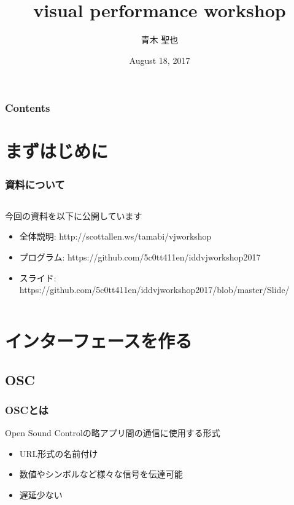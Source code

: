 \documentclass[10pt, dvipdfmx]{beamer}
\title{visual performance workshop}
\author{青木 聖也}
\institute[所属]{多摩美術大学情報デザイン研究室}
\date{August 18, 2017}
\begin{document}
    \begin{frame}[plain]
        \frametitle{}
	    \titlepage
    \end{frame}

    \begin{frame}
        \frametitle{Contents}
        \tableofcontents
    \end{frame}

    \section{まずはじめに}
        \begin{frame}
            \frametitle{資料について}
            \begin{columns}[c]
                \begin{column}{0.80\textwidth}
                    \begin{block}{今回の資料を以下に公開しています}
                        \begin{itemize}
                            \scriptsize
                            \item 全体説明: http://scottallen.ws/tamabi/vjworkshop
                            \item プログラム: https://github.com/5c0tt411en/iddvjworkshop2017
                            \item スライド: https://github.com/5c0tt411en/iddvjworkshop2017/blob/master/Slide/
                        \end{itemize}
                    \end{block}
                \end{column}
            \end{columns}
        \end{frame}

    \section{インターフェースを作る}
    \subsection{OSC}
        \begin{frame}
            \frametitle{OSCとは}
            \begin{block}{Open Sound Controlの略アプリ間の通信に使用する形式}
                \begin{itemize}
                    \item URL形式の名前付け
                    \item 数値やシンボルなど様々な信号を伝達可能
                    \item 遅延少ない
                \end{itemize}
            \end{block}
        \end{frame}
\end{document}
